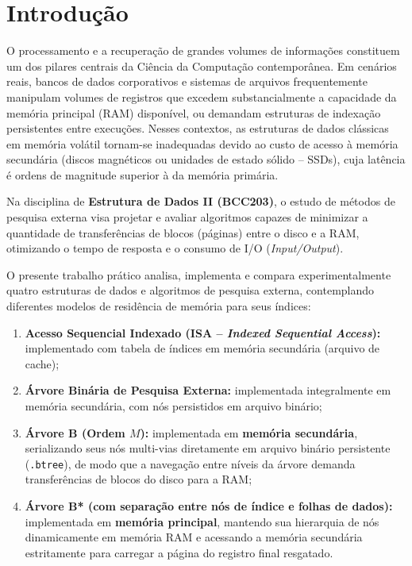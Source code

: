 \documentclass[12pt,a4paper]{article}
\begin{document}
\section{Introdução}
\label{sec:introducao}

O processamento e a recuperação de grandes volumes de informações constituem um dos pilares centrais da Ciência da Computação contemporânea. Em cenários reais, bancos de dados corporativos e sistemas de arquivos frequentemente manipulam volumes de registros que excedem substancialmente a capacidade da memória principal (RAM) disponível, ou demandam estruturas de indexação persistentes entre execuções. Nesses contextos, as estruturas de dados clássicas em memória volátil tornam-se inadequadas devido ao custo de acesso à memória secundária (discos magnéticos ou unidades de estado sólido -- SSDs), cuja latência é ordens de magnitude superior à da memória primária.

Na disciplina de \textbf{Estrutura de Dados II (BCC203)}, o estudo de métodos de pesquisa externa visa projetar e avaliar algoritmos capazes de minimizar a quantidade de transferências de blocos (páginas) entre o disco e a RAM, otimizando o tempo de resposta e o consumo de I/O (\textit{Input/Output}).

O presente trabalho prático analisa, implementa e compara experimentalmente quatro estruturas de dados e algoritmos de pesquisa externa, contemplando diferentes modelos de residência de memória para seus índices:
\begin{enumerate}
    \item \textbf{Acesso Sequencial Indexado (ISA -- \textit{Indexed Sequential Access}):} implementado com tabela de índices em memória secundária (arquivo de cache);
    \item \textbf{Árvore Binária de Pesquisa Externa:} implementada integralmente em memória secundária, com nós persistidos em arquivo binário;
    \item \textbf{Árvore B (Ordem $M$):} implementada em \textbf{memória secundária}, serializando seus nós multi-vias diretamente em arquivo binário persistente (\texttt{.btree}), de modo que a navegação entre níveis da árvore demanda transferências de blocos do disco para a RAM;
    \item \textbf{Árvore B* (com separação entre nós de índice e folhas de dados):} implementada em \textbf{memória principal}, mantendo sua hierarquia de nós dinamicamente em memória RAM e acessando a memória secundária estritamente para carregar a página do registro final resgatado.
\end{enumerate}
\end{document}
